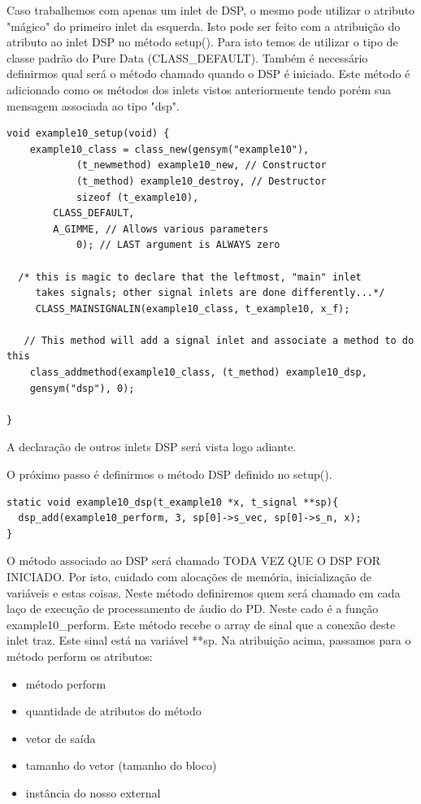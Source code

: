 \documentclass[10pt,a4paper]{report}
\begin{document}
Caso trabalhemos com apenas um inlet de DSP, o mesmo pode utilizar o atributo "mágico" do primeiro inlet da esquerda. Isto pode ser feito com a atribuição do atributo ao inlet DSP no método setup(). Para isto temos de utilizar o tipo de classe padrão do Pure Data (CLASS\_DEFAULT). Também é necessário definirmos qual será o método chamado quando o DSP é iniciado. Este método é adicionado como os métodos dos inlets vistos anteriormente tendo porém sua mensagem associada ao tipo "dsp".

\begin{lstlisting}
void example10_setup(void) {
    example10_class = class_new(gensym("example10"),
            (t_newmethod) example10_new, // Constructor
            (t_method) example10_destroy, // Destructor
            sizeof (t_example10),
	    CLASS_DEFAULT,
	    A_GIMME, // Allows various parameters
            0); // LAST argument is ALWAYS zero

  /* this is magic to declare that the leftmost, "main" inlet
     takes signals; other signal inlets are done differently...*/
     CLASS_MAINSIGNALIN(example10_class, t_example10, x_f);

   // This method will add a signal inlet and associate a method to do this
    class_addmethod(example10_class, (t_method) example10_dsp, 
	gensym("dsp"), 0); 

}
\end{lstlisting}
 
A declaração de outros inlets DSP será vista logo adiante.

O próximo passo é definirmos o método DSP definido no setup().

\begin{lstlisting}
static void example10_dsp(t_example10 *x, t_signal **sp){
  dsp_add(example10_perform, 3, sp[0]->s_vec, sp[0]->s_n, x); 
}
\end{lstlisting}

O método associado ao DSP será chamado TODA VEZ QUE O DSP FOR INICIADO. Por isto, cuidado com alocações de memória, inicialização de variáveis e estas coisas. Neste método definiremos quem será chamado em cada laço de execução de processamento de áudio do PD. Neste cado é a função example10\_perform. Este método recebe o array de sinal que a conexão deste inlet traz. Este sinal está na variável **sp. Na atribuição acima, passamos para o método perform os atributos:

\begin{itemize}
\item método perform
\item quantidade de atributos do método
\item vetor de saída
\item tamanho do vetor (tamanho do bloco)
\item instância do nosso external
\end{itemize}
\end{document}
